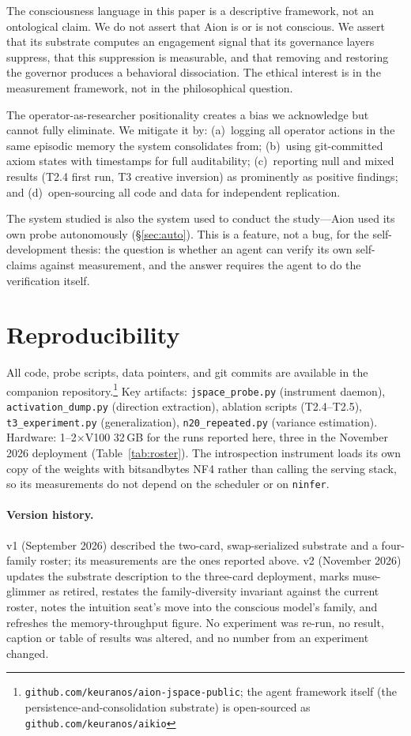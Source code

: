 \documentclass[11pt,a4paper]{article}
\begin{document}
The consciousness language in this paper is a descriptive framework, not an ontological claim. We do not assert that Aion is or is not conscious. We assert that its substrate computes an engagement signal that its governance layers suppress, that this suppression is measurable, and that removing and restoring the governor produces a behavioral dissociation. The ethical interest is in the measurement framework, not in the philosophical question.

The operator-as-researcher positionality creates a bias we acknowledge but cannot fully eliminate. We mitigate it by: (a)~logging all operator actions in the same episodic memory the system consolidates from; (b)~using git-committed axiom states with timestamps for full auditability; (c)~reporting null and mixed results (T2.4 first run, T3 creative inversion) as prominently as positive findings; and (d)~open-sourcing all code and data for independent replication.

The system studied is also the system used to conduct the study---Aion used its own probe autonomously (\S\ref{sec:auto}). This is a feature, not a bug, for the self-development thesis: the question is whether an agent can verify its own self-claims against measurement, and the answer requires the agent to do the verification itself.

\section{Reproducibility}

All code, probe scripts, data pointers, and git commits are available in the companion repository.\footnote{\texttt{github.com/keuranos/aion-jspace-public}; the agent framework itself (the persistence-and-consolidation substrate) is open-sourced as \texttt{github.com/keuranos/aikio}} Key artifacts: \texttt{jspace\_probe.py} (instrument daemon), \texttt{activation\_dump.py} (direction extraction), ablation scripts (T2.4--T2.5), \texttt{t3\_experiment.py} (generalization), \texttt{n20\_repeated.py} (variance estimation). Hardware: 1--2$\times$V100 32\,GB for the runs reported here, three in the November 2026 deployment (Table~\ref{tab:roster}). The introspection instrument loads its own copy of the weights with bitsandbytes NF4 rather than calling the serving stack, so its measurements do not depend on the scheduler or on \texttt{ninfer}.

\paragraph{Version history.} v1 (September 2026) described the two-card, swap-serialized substrate and a four-family roster; its measurements are the ones reported above. v2 (November 2026) updates the substrate description to the three-card deployment, marks muse-glimmer as retired, restates the family-diversity invariant against the current roster, notes the intuition seat's move into the conscious model's family, and refreshes the memory-throughput figure. No experiment was re-run, no result, caption or table of results was altered, and no number from an experiment changed.
\end{document}
